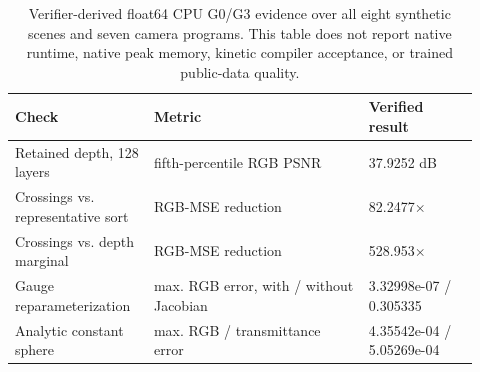 \begin{table}[t]
\centering
\setlength{\tabcolsep}{4pt}
\begin{tabular}{@{}p{0.27\linewidth}p{0.43\linewidth}p{0.22\linewidth}@{}}
\toprule
Check & Metric & Verified result \\
\midrule
Retained depth, 128 layers & fifth-percentile RGB PSNR & 37.9252 dB \\
Crossings vs. representative sort & RGB-MSE reduction & 82.2477$\times$ \\
Crossings vs. depth marginal & RGB-MSE reduction & 528.953$\times$ \\
Gauge reparameterization & max. RGB error, with / without Jacobian & 3.32998e-07 / 0.305335 \\
Analytic constant sphere & max. RGB / transmittance error & 4.35542e-04 / 5.05269e-04 \\
\bottomrule
\end{tabular}
\caption{Verifier-derived float64 CPU G0/G3 evidence over all eight synthetic scenes and seven camera programs. This table does not report native runtime, native peak memory, kinetic compiler acceptance, or trained public-data quality.}
\label{tab:worldfoam-synthetic-visibility}
\end{table}
